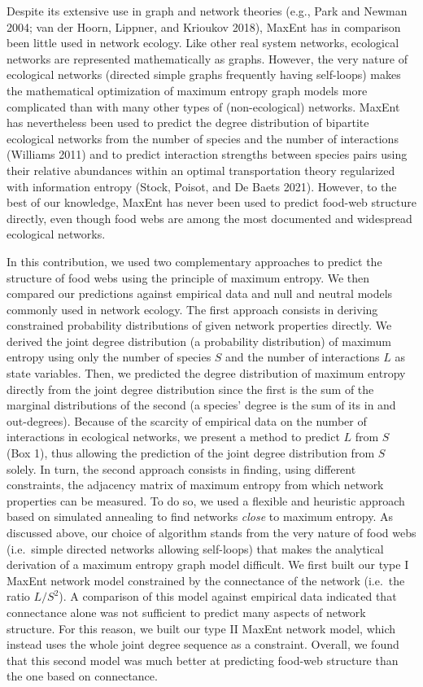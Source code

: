\documentclass[10pt,oneside]{article}
\begin{document}
Despite its extensive use in graph and network theories (e.g., Park and
Newman 2004; van der Hoorn, Lippner, and Krioukov 2018), MaxEnt has in
comparison been little used in network ecology. Like other real system
networks, ecological networks are represented mathematically as graphs.
However, the very nature of ecological networks (directed simple graphs
frequently having self-loops) makes the mathematical optimization of
maximum entropy graph models more complicated than with many other types
of (non-ecological) networks. MaxEnt has nevertheless been used to
predict the degree distribution of bipartite ecological networks from
the number of species and the number of interactions (Williams 2011) and
to predict interaction strengths between species pairs using their
relative abundances within an optimal transportation theory regularized
with information entropy (Stock, Poisot, and De Baets 2021). However, to
the best of our knowledge, MaxEnt has never been used to predict
food-web structure directly, even though food webs are among the most
documented and widespread ecological networks.

In this contribution, we used two complementary approaches to predict
the structure of food webs using the principle of maximum entropy. We
then compared our predictions against empirical data and null and
neutral models commonly used in network ecology. The first approach
consists in deriving constrained probability distributions of given
network properties directly. We derived the joint degree distribution (a
probability distribution) of maximum entropy using only the number of
species \(S\) and the number of interactions \(L\) as state variables.
Then, we predicted the degree distribution of maximum entropy directly
from the joint degree distribution since the first is the sum of the
marginal distributions of the second (a species' degree is the sum of
its in and out-degrees). Because of the scarcity of empirical data on
the number of interactions in ecological networks, we present a method
to predict \(L\) from \(S\) (Box 1), thus allowing the prediction of the
joint degree distribution from \(S\) solely. In turn, the second
approach consists in finding, using different constraints, the adjacency
matrix of maximum entropy from which network properties can be measured.
To do so, we used a flexible and heuristic approach based on simulated
annealing to find networks \emph{close} to maximum entropy. As discussed
above, our choice of algorithm stands from the very nature of food webs
(i.e.~simple directed networks allowing self-loops) that makes the
analytical derivation of a maximum entropy graph model difficult. We
first built our type I MaxEnt network model constrained by the
connectance of the network (i.e.~the ratio \(L/S^2\)). A comparison of
this model against empirical data indicated that connectance alone was
not sufficient to predict many aspects of network structure. For this
reason, we built our type II MaxEnt network model, which instead uses
the whole joint degree sequence as a constraint. Overall, we found that
this second model was much better at predicting food-web structure than
the one based on connectance.
\end{document}
